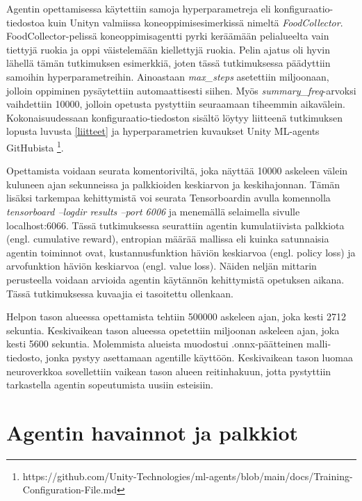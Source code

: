\documentclass[utf8]{gradu3}
\begin{document}
Agentin opettamisessa käytettiin samoja hyperparametreja eli konfiguraatio-tiedostoa kuin Unityn valmiissa koneoppimisesimerkissä nimeltä \textit{FoodCollector}. FoodCollector-pelissä koneoppimisagentti pyrki keräämään pelialueelta vain tiettyjä ruokia ja oppi väistelemään kiellettyjä ruokia. Pelin ajatus oli hyvin lähellä tämän tutkimuksen esimerkkiä, joten tässä tutkimuksessa päädyttiin samoihin hyperparametreihin. Ainoastaan \textit{max\_steps} asetettiin miljoonaan, jolloin oppiminen pysäytettiin automaattisesti siihen. Myös \textit{summary\_freq}-arvoksi vaihdettiin 10000, jolloin opetusta pystyttiin seuraamaan tiheemmin aikavälein. Kokonaisuudessaan konfiguraatio-tiedoston sisältö löytyy liitteenä tutkimuksen lopusta luvusta \ref{liitteet} ja hyperparametrien kuvaukset Unity ML-agents GitHubista \footnote{https://github.com/Unity-Technologies/ml-agents/blob/main/docs/Training-Configuration-File.md}.

Opettamista voidaan seurata komentoriviltä, joka näyttää 10000 askeleen välein kuluneen ajan sekunneissa ja palkkioiden keskiarvon ja keskihajonnan. Tämän lisäksi tarkempaa kehittymistä voi seurata Tensorboardin avulla komennolla \textit{tensorboard --logdir results --port 6006} ja menemällä selaimella sivulle localhost:6066. Tässä tutkimuksessa seurattiin agentin kumulatiivista palkkiota (engl. cumulative reward), entropian määrää mallissa eli kuinka satunnaisia agentin toiminnot ovat, kustannusfunktion häviön keskiarvoa (engl. policy loss) ja arvofunktion häviön keskiarvoa (engl. value loss). Näiden neljän mittarin perusteella voidaan arvioida agentin käytännön kehittymistä opetuksen aikana. Tässä tutkimuksessa kuvaajia ei tasoitettu ollenkaan.

Helpon tason alueessa opettamista tehtiin 500000 askeleen ajan, joka kesti 2712 sekuntia. Keskivaikean tason alueessa opetettiin miljoonan askeleen ajan, joka kesti 5600 sekuntia. Molemmista alueista muodostui .onnx-päätteinen malli-tiedosto, jonka pystyy asettamaan agentille käyttöön. Keskivaikean tason luomaa neuroverkkoa sovellettiin vaikean tason alueen reitinhakuun, jotta pystyttiin tarkastella agentin sopeutumista uusiin esteisiin.

\section{Agentin havainnot ja palkkiot}
\end{document}
